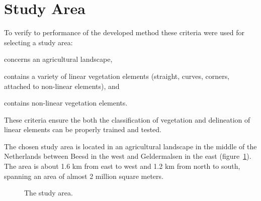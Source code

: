 \section{Study Area}
To verify to performance of the developed method these criteria were used for selecting a study area:
\begin{enumerate*}[(i)]
	\item concerns an agricultural landscape,
	\item contains a variety of linear vegetation elements (straight, curves, corners, attached to non-linear elements), and
	\item contains non-linear vegetation elements.
\end{enumerate*}
These criteria ensure the both the classification of vegetation and delineation of linear elements can be properly trained and tested.

The chosen study area is located in an agricultural landscape in the middle of the Netherlands between Beesd in the west and Geldermalsen in the east (figure~\ref{fig:ResearchArea}). The area is about 1.6 km from east to west and 1.2 km from north to south, spanning an area of almost 2 million square meters. 
\begin{figure}
	\centering
	\caption{The study area.}
	\label{fig:ResearchArea}
\end{figure}